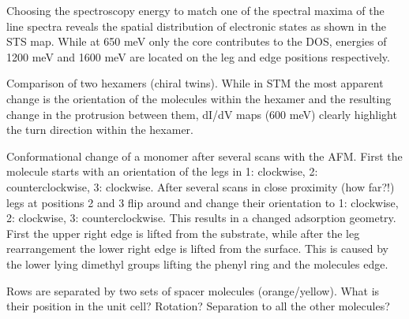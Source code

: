 Choosing the spectroscopy energy to match one of the spectral maxima of the line spectra reveals the spatial distribution of electronic states as shown in the STS map. While at 650 meV only the core contributes to the DOS, energies of 1200 meV and 1600 meV are located on the leg and edge positions respectively. 

Comparison of two hexamers (chiral twins). While in STM the most apparent change is the orientation of the molecules within the hexamer and the resulting change in the protrusion between them, dI/dV maps (600 meV) clearly highlight the turn direction within the hexamer.

Conformational change of a monomer after several scans with the AFM. First the molecule starts with an orientation of the legs in 1: clockwise, 2: counterclockwise, 3: clockwise. After several scans in close proximity (how far?!) legs at positions 2 and 3 flip around and change their orientation to 1: clockwise, 2: clockwise, 3: counterclockwise. This results in a changed adsorption geometry. First the upper right edge is lifted from the substrate, while after the leg rearrangement the lower right edge is lifted from the surface. This is caused by the lower lying dimethyl groups lifting the phenyl ring and the molecules edge.

Rows are separated by two sets of spacer molecules (orange/yellow). 
What is their position in the unit cell? Rotation? Separation to all the other molecules? 

